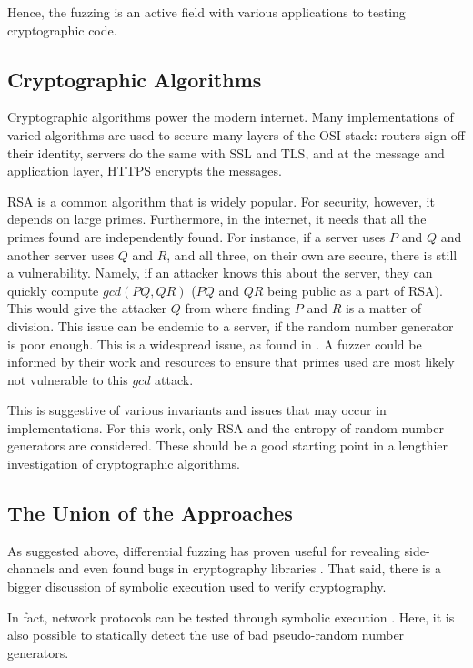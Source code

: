 \documentclass[letterpaper,twocolumn,10pt]{article}
\begin{document}
Hence, the fuzzing is an active field with various applications to testing
cryptographic code.

\subsection{Cryptographic Algorithms}

Cryptographic algorithms power the modern internet. Many implementations
of varied algorithms are used to secure many layers of the OSI stack: routers
sign off their identity, servers do the same with SSL and TLS, and at the message
and application layer, HTTPS encrypts the messages.

RSA is a common algorithm that is widely popular. For security, however, it depends
on large primes. Furthermore, in the internet, it needs that all the primes found
are independently found. For instance, if a server uses $P$ and $Q$ and another
server uses $Q$ and $R$, and all three, on their own are secure, there is still a
vulnerability. Namely, if an attacker knows this about the server, they can quickly
compute $gcd(PQ, QR)$ ($PQ$ and $QR$ being public as a part of RSA). This would give
the attacker $Q$ from where finding $P$ and $R$ is a matter of division. This issue
can be endemic to a server, if the random number generator is poor enough. This is
a widespread issue, as found in \cite{miningPQ}. A fuzzer could be informed by their
work and resources to ensure that primes used are most likely not vulnerable to this
$gcd$ attack.

This is suggestive of various invariants and issues that may occur in implementations.
For this work, only RSA and the entropy of random number generators are considered.
These should be a good starting point in a lengthier investigation of cryptographic
algorithms.

\subsection{The Union of the Approaches}

As suggested above, differential fuzzing has proven useful for revealing side-channels
and even found bugs in cryptography libraries \cite{cdf}. That said, there is a bigger
discussion of symbolic execution used to verify cryptography.

In fact, network protocols can be tested through symbolic execution \cite{symExeCrypto}.
Here, it is also possible to statically detect the use of bad pseudo-random number generators.
\end{document}
